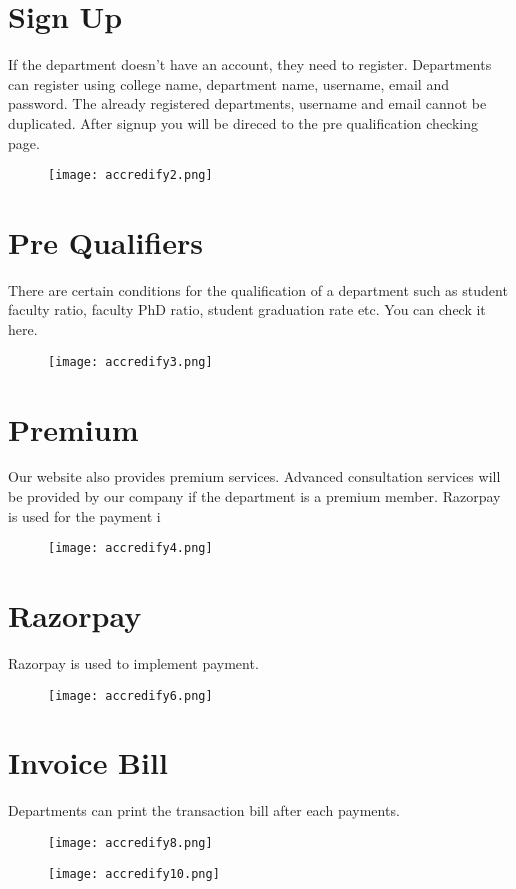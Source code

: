 \documentclass[a4paper,11pt]{report}
\begin{document}
\section{Sign Up}
If the department doesn't have an account, they need to register. Departments can register using college name, department name, username, email and password. The already registered departments, username and email cannot be duplicated. After signup you will be direced to the pre qualification checking page. 
\begin{figure}[h]
	\centering
	\hspace{21pt}
	\texttt{[image: accredify2.png]}
	\label{fig:logo.png}
\end{figure}

\section{Pre Qualifiers}
There are certain conditions for the qualification of a department such as student faculty ratio, faculty PhD ratio, student graduation rate etc. You can check it here. 
\begin{figure}[h]
	\centering
	\hspace{21pt}
	\texttt{[image: accredify3.png]}
	\label{fig:logo.png}
\end{figure}

\section{Premium}
Our website also provides premium services. Advanced consultation services will be provided by our company if the department is a premium member. Razorpay is used for the payment i
\begin{figure}[h]
	\centering
	\hspace{21pt}
	\texttt{[image: accredify4.png]}
	\label{fig:logo.png}
\end{figure}
\section{Razorpay}
Razorpay is used to implement payment.
\begin{figure}[h]
	\centering
	\hspace{21pt}
	\texttt{[image: accredify6.png]}
	\label{fig:logo.png}
\end{figure}

\section{Invoice Bill}
Departments can print the transaction bill after each payments.
\begin{figure}[h]
	\centering
	\hspace{21pt}
	\texttt{[image: accredify8.png]}
	\label{fig:logo.png}
\end{figure}
\begin{figure}[h]
	\centering
	\hspace{21pt}
	\texttt{[image: accredify10.png]}
	\label{fig:logo.png}
\end{figure}
\end{document}
